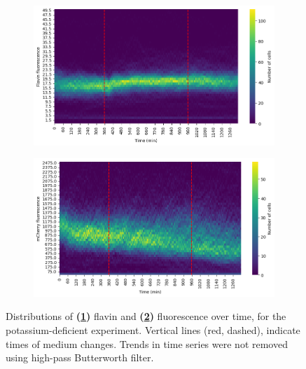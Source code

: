 \begin{figure}
  \centering
  \begin{subfigure}[htpb]{0.8\textwidth}
   \centering
   \includegraphics[width=\textwidth]{613_distribs_flavin.png}
   \caption{
   }
   \label{fig:biology-kdeficient-histogram-flavin}
  \end{subfigure}

  \begin{subfigure}[htpb]{0.8\textwidth}
   \centering
   \includegraphics[width=\textwidth]{613_distribs_mCherry.png}
   \caption{
   }
   \label{fig:biology-kdeficient-histogram-mCherry}
  \end{subfigure}

  \caption{
    Distributions of \textbf{(\ref{fig:biology-kdeficient-histogram-flavin})} flavin and \textbf{(\ref{fig:biology-kdeficient-histogram-mCherry})} fluorescence over time, for the potassium-deficient experiment.
    Vertical lines (red, dashed), indicate times of medium changes.
    Trends in time series were not removed using high-pass Butterworth filter.
  }
  \label{fig:biology-kdeficient-histogram}
\end{figure}


